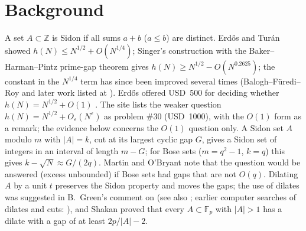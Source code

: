 \documentclass[11pt]{article}
\begin{document}
\section{Background}
A set $A\subset\mathbb Z$ is Sidon if all sums $a+b$ ($a\le b$) are distinct. Erd\H{o}s and Tur\'an \cite{ET} showed
$h(N)\le N^{1/2}+O(N^{1/4})$; Singer's construction \cite{Si} with the Baker--Harman--Pintz prime-gap theorem \cite{BHP} gives
$h(N)\ge N^{1/2}-O(N^{0.2625})$; the constant in the $N^{1/4}$ term has since been improved several times (Balogh--F\"uredi--Roy
\cite{BFR} and later work listed at \cite{EP}). Erd\H{o}s offered USD~500 for deciding whether
$h(N)=N^{1/2}+O(1)$ \cite{Guy,MO}. The site \cite{EP} lists the weaker question $h(N)=N^{1/2}+O_\varepsilon(N^\varepsilon)$ as
problem \#30 (USD~1000), with the $O(1)$ form as a remark; the evidence below concerns the $O(1)$ question only.
A Sidon set $A$ modulo $m$ with $|A|=k$, cut at its largest cyclic gap $G$, gives a Sidon set of integers in an interval of length
$m-G$; for Bose sets \cite{Bo} ($m=q^2-1$, $k=q$) this gives $k-\sqrt{N}\approx G/(2q)$. Martin and O'Bryant \cite{MO} note that
the question would be answered (excess unbounded) if Bose sets had gaps that are not $O(q)$. Dilating $A$ by a unit $t$ preserves
the Sidon property and moves the gaps; the use of dilates was suggested in B.~Green's comment on \cite{Go} (see also \cite{Gr}; earlier computer searches of dilates and cuts: \cite{Z,RD}), and Shakan \cite{Sh}
proved that every $A\subset\mathbb F_p$ with $|A|>1$ has a dilate with a gap of at least $2p/|A|-2$.
\end{document}
